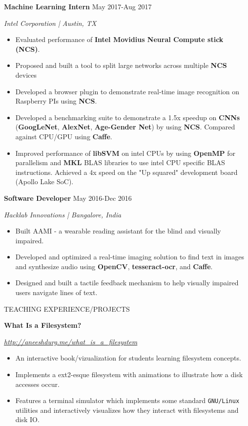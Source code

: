 \documentclass[paper=a4,fontsize=11pt]{scrartcl} %
\newcommand{\sepspace}{\vspace*{1em}}		%
\newcommand{\NewPart}[1]{ \noindent \large \usefont{OT1}{phv}{b}{n}\uppercase{#1} \normalfont \normalsize}
\newcommand{\EducationEntry}[4]{
		\noindent \textbf{#1}     %
			\hfill#2 \par  %
		\noindent \textit{#3} \par        %
		\noindent\hangafter=0 \small #4 %
		\normalsize \par}
\begin{document}
\EducationEntry{Machine Learning Intern}{May 2017-Aug 2017}{Intel Corporation | Austin, TX}{
\begin{itemize}
  \item Evaluated performance of \textbf{ Intel Movidius Neural Compute stick (NCS)}.
  \item Proposed and built a tool to split large networks across multiple \textbf{NCS} devices
  \item Developed a browser plugin to demonstrate real-time image recognition on Raspberry PIs using \textbf{NCS}.
  \item Developed a benchmarking suite to demonstrate a 1.5x speedup on \textbf{CNNs}  (\textbf{GoogLeNet}, \textbf{AlexNet}, \textbf{Age-Gender Net}) by using \textbf{NCS}. Compared against CPU/GPU using \textbf{Caffe}.
  \item Improved performance of \textbf{libSVM} on intel CPUs by using \textbf{OpenMP} for parallelism and \textbf{MKL} BLAS libraries to use intel CPU specific BLAS instructions. Achieved a 4x speed on the "Up squared" development board (Apollo Lake SoC).
\end{itemize}
}

\EducationEntry{Software Developer}{May 2016-Dec 2016}{Hacklab Innovations | Bangalore, India}{
\begin{itemize}
\item Built AAMI - a wearable reading assistant for the blind and visually impaired.
\item Developed and optimized a real-time imaging solution to find text in images and synthesize audio using \textbf{OpenCV}, \textbf{tesseract-ocr}, and \textbf{Caffe}.
\item Designed and built a tactile feedback mechanism to help visually impaired users navigate lines of text.
\end{itemize}
}


\sepspace
\NewPart{Teaching Experience/Projects}{}
\newline

\EducationEntry{What Is a Filesystem?}{}{\url{http://aneeshdurg.me/what_is_a_filesystem}}{
\begin{itemize}
\item An interactive book/vizualization for students learning filesystem concepts.
\item Implements a ext2-esque filesystem with animations to illustrate how a disk accesses occur.
\item Features a terminal simulator which implements some standard \texttt{GNU/Linux} utilities and interactively visualizes how they interact with filesystems and disk IO.%
\end{itemize}
}
\end{document}
